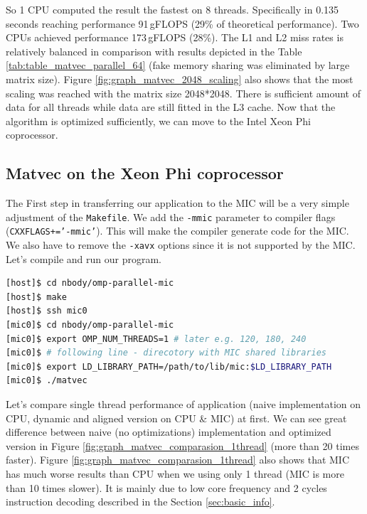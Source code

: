 So 1 CPU computed the result the fastest on 8 threads. Specifically in 0.135 seconds reaching performance 91\,gFLOPS (29\% of theoretical performance). Two CPUs achieved performance 173\,gFLOPS (28\%). The L1 and L2 miss rates is relatively balanced in comparison with results depicted in the Table \ref{tab:table_matvec_parallel_64} (fake memory sharing was eliminated by large matrix size). Figure \ref{fig:graph_matvec_2048_scaling} also shows that the most  scaling was reached with the matrix size 2048*2048. There is sufficient amount of data for all threads while data are still fitted in the L3 cache. Now that the algorithm is optimized sufficiently, we can move to the Intel Xeon Phi coprocessor.

\subsection{Matvec on the Xeon Phi coprocessor}
The First step in transferring our application to the MIC will be a very simple adjustment of the \texttt{Makefile}. We add the \texttt{-mmic} parameter to compiler flags (\texttt{CXXFLAGS+='-mmic'}). This will make the compiler generate code for the MIC. We also have to remove the \texttt{-xavx} options since it is not supported by the MIC. Let's compile and run our program.

\bigskip
\begin{lstlisting}[language=bash, caption=Compilation and execution a native aplication for Xeon Phi., captionpos=b, label=code_compile_execute]
[host]$ cd nbody/omp-parallel-mic
[host]$ make
[host]$ ssh mic0
[mic0]$ cd nbody/omp-parallel-mic
[mic0]$ export OMP_NUM_THREADS=1 # later e.g. 120, 180, 240
[mic0]$ # following line - direcotory with MIC shared libraries
[mic0]$ export LD_LIBRARY_PATH=/path/to/lib/mic:$LD_LIBRARY_PATH
[mic0]$ ./matvec
\end{lstlisting}
\bigskip

Let's compare single thread performance of application (naive implementation on CPU, dynamic and aligned version on CPU \& MIC) at first. We can see great difference between naive (no optimizations) implementation and optimized version in Figure \ref{fig:graph_matvec_comparasion_1thread} (more than 20 times faster). Figure \ref{fig:graph_matvec_comparasion_1thread} also shows that MIC has much worse results than CPU when we using only 1 thread (MIC is more than 10 times slower). It is mainly due to low core frequency and 2 cycles instruction decoding described in the Section \ref{sec:basic_info}.  

